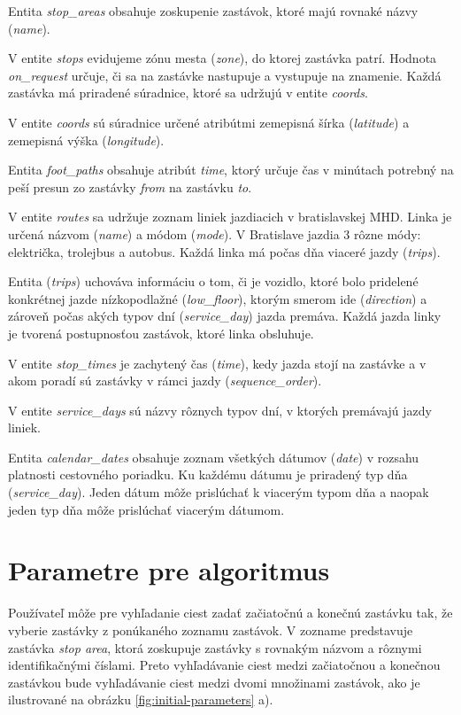 Entita \textit{stop\_areas} obsahuje zoskupenie zastávok, ktoré majú rovnaké názvy (\textit{name}). 


V entite \textit{stops} evidujeme zónu mesta (\textit{zone}), do ktorej zastávka patrí. Hodnota \textit{on\_request} určuje, či sa na  zastávke nastupuje a vystupuje na znamenie. Každá zastávka má priradené súradnice, ktoré sa udržujú v entite \textit{coords}.

V entite \textit{coords} sú súradnice určené atribútmi zemepisná šírka (\textit{latitude}) a zemepisná výška (\textit{longitude}). 

Entita \textit{foot\_paths} obsahuje atribút \textit{time}, ktorý určuje čas v minútach potrebný na peší presun zo zastávky \textit{from} na zastávku \textit{to}.

V entite \textit{routes} sa udržuje zoznam liniek jazdiacich v bratislavskej MHD. Linka je určená názvom (\textit{name}) a módom (\textit{mode}). V Bratislave jazdia 3 rôzne módy: električka, trolejbus a autobus. Každá linka má počas dňa viaceré jazdy (\textit{trips}).

Entita (\textit{trips}) uchováva informáciu o tom, či je vozidlo, ktoré bolo pridelené konkrétnej jazde nízkopodlažné (\textit{low\_floor}), ktorým smerom ide (\textit{direction}) a zároveň počas akých typov dní (\textit{service\_day}) jazda premáva. Každá jazda linky je tvorená postupnosťou zastávok, ktoré linka obsluhuje.

V entite \textit{stop\_times} je zachytený čas (\textit{time}), kedy jazda stojí na zastávke a v akom poradí sú zastávky v rámci jazdy (\textit{sequence\_order}).

V entite \textit{service\_days} sú názvy rôznych typov dní, v ktorých premávajú jazdy liniek. 

Entita \textit{calendar\_dates} obsahuje zoznam všetkých dátumov (\textit{date}) v rozsahu platnosti cestovného poriadku. Ku každému dátumu je priradený typ dňa (\textit{service\_day}). Jeden dátum môže prislúchať k viacerým typom dňa a naopak jeden typ dňa môže prislúchať viacerým dátumom.

\section{Parametre pre algoritmus}
Používateľ môže pre vyhľadanie ciest zadať začiatočnú a konečnú zastávku tak, že vyberie zastávky z ponúkaného zoznamu zastávok. V zozname predstavuje zastávka \textit{stop area}, ktorá zoskupuje zastávky s rovnakým názvom a rôznymi identifikačnými číslami. Preto vyhľadávanie ciest medzi začiatočnou a konečnou zastávkou bude vyhľadávanie ciest medzi  dvomi množinami zastávok, ako je ilustrované na obrázku \ref{fig:initial-parameters} a).

